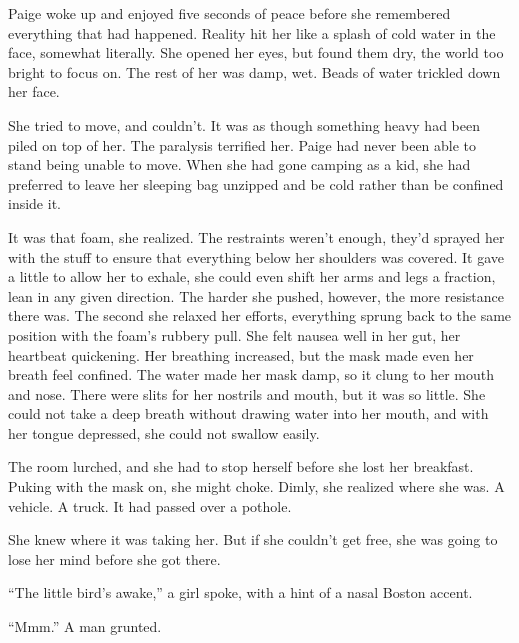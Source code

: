 \blacksquare



Paige woke up and enjoyed five seconds of peace before she remembered everything that had happened.  Reality hit her like a splash of cold water in the face, somewhat literally.  She opened her eyes, but found them dry, the world too bright to focus on.  The rest of her was damp, wet.  Beads of water trickled down her face.



She tried to move, and couldn't.  It was as though something heavy had been piled on top of her.  The paralysis terrified her.  Paige had never been able to stand being unable to move.  When she had gone camping as a kid, she had preferred to leave her sleeping bag unzipped and be cold rather than be confined inside it.



It was that foam, she realized.  The restraints weren't enough, they'd sprayed her with the stuff to ensure that everything below her shoulders was covered.  It gave a little to allow her to exhale, she could even shift her arms and legs a fraction, lean in any given direction. The harder she pushed, however, the more resistance there was.  The second she relaxed her efforts, everything sprung back to the same position with the foam's rubbery pull.  She felt nausea well in her gut, her heartbeat quickening.  Her breathing increased, but the mask made even her breath feel confined.  The water made her mask damp, so it clung to her mouth and nose.  There were slits for her nostrils and mouth, but it was so little.  She could not take a deep breath without drawing water into her mouth, and with her tongue depressed, she could not swallow easily.



The room lurched, and she had to stop herself before she lost her breakfast.  Puking with the mask on, she might choke.  Dimly, she realized where she was.  A vehicle.  A truck.  It had passed over a pothole.



She knew where it was taking her.  But if she couldn't get free, she was going to lose her mind before she got there.



``The little bird's awake,'' a girl spoke, with a hint of a nasal Boston accent.



``Mmm.''  A man grunted.



